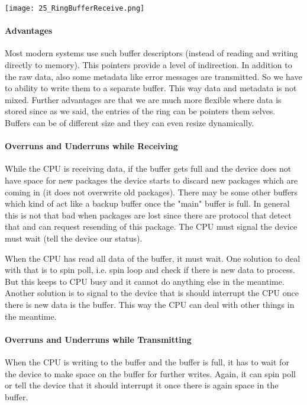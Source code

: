 \texttt{[image: 25\_RingBufferReceive.png]}

\paragraph{Advantages}
Most modern systems use such buffer descriptors (instead of reading and writing directly to memory). This pointers provide a level of indirection. In addition to the raw data, also some metadata like error messages are transmitted. So we have to ability to write them to a separate buffer. This way data and metadata is not mixed. Further advantages are that we are much more flexible where data is stored since as we said, the entries of the ring can be pointers them selves. Buffers can be of different size and they can even resize dynamically.

\paragraph{Overruns and Underruns while Receiving}
While the CPU is receiving data, if the buffer gets full and the device does not have space for new packages the device starts to discard new packages which are coming in (it does not overwrite old packages). There may be some other buffers which kind of act like a backup buffer once the "main" buffer is full. In general this is not that bad when packages are lost since there are protocol that detect that and can request resending of this package. The CPU must signal the device must wait (tell the device our status).

When the CPU has read all data of the buffer, it must wait. One solution to deal with that is to spin poll, i.e. spin loop and check if there is new data to process. But this keeps to CPU busy and it cannot do anything else in the meantime. Another solution is to signal to the device that is should interrupt the CPU once there is new data is the buffer. This way the CPU can deal with other things in the meantime.

\paragraph{Overruns and Underruns while Transmitting}
When the CPU is writing to the buffer and the buffer is full, it has to wait for the device to make space on the buffer for further writes. Again, it can spin poll or tell the device that it should interrupt it once there is again space in the buffer.

